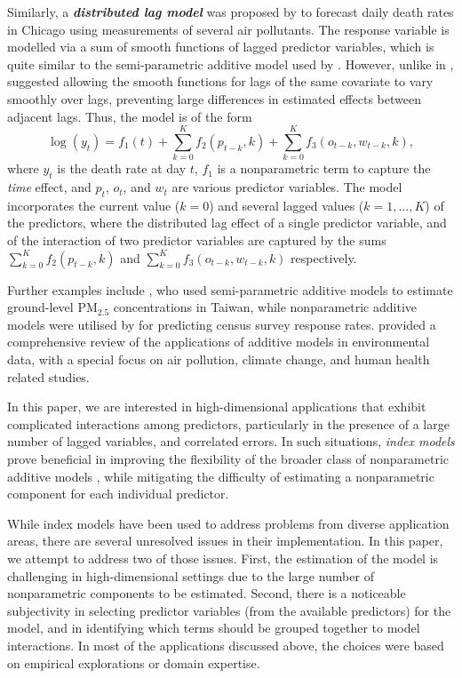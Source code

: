 \documentclass[
  11pt,
  a4paper,
]{article}
\begin{document}
Similarly, a \textbf{\emph{distributed lag model}} was proposed by
\textcite{Wood2017} to forecast daily death rates in Chicago using
measurements of several air pollutants. The response variable is
modelled via a sum of smooth functions of lagged predictor variables,
which is quite similar to the semi-parametric additive model used by
\textcite{FH2012}. However, unlike in \textcite{FH2012},
\textcite{Wood2017} suggested allowing the smooth functions for lags of
the same covariate to vary smoothly over lags, preventing large
differences in estimated effects between adjacent lags. Thus, the model
is of the form \[
 \log(y_{t}) = f_{1}(t) + \sum_{k=0}^{K} f_{2}(p_{t-k}, k) + \sum_{k=0}^{K} f_{3}(o_{t-k}, w_{t-k}, k),
\] where \(y_{t}\) is the death rate at day \(t\), \(f_{1}\) is a
nonparametric term to capture the \emph{time} effect, and \(p_t\),
\(o_t\), and \(w_t\) are various predictor variables. The model
incorporates the current value (\(k = 0\)) and several lagged values
(\(k = 1, \dots, K\)) of the predictors, where the distributed lag
effect of a single predictor variable, and of the interaction of two
predictor variables are captured by the sums
\(\sum_{k=0}^{K} f_{2}(p_{t-k}, k)\) and
\(\sum_{k=0}^{K} f_{3}(o_{t-k}, w_{t-k}, k)\) respectively.

Further examples include \textcite{Ho2020}, who used semi-parametric
additive models to estimate ground-level \(\text{PM}_{2.5}\)
concentrations in Taiwan, while nonparametric additive models were
utilised by \textcite{Ibrahim2021} for predicting census survey response
rates. \textcite{Ravindra2019} provided a comprehensive review of the
applications of additive models in environmental data, with a special
focus on air pollution, climate change, and human health related
studies.

In this paper, we are interested in high-dimensional applications that
exhibit complicated interactions among predictors, particularly in the
presence of a large number of lagged variables, and correlated errors.
In such situations, \emph{index models} prove beneficial in improving
the flexibility of the broader class of nonparametric additive models
\autocite{Radchenko2015}, while mitigating the difficulty of estimating
a nonparametric component for each individual predictor.

While index models have been used to address problems from diverse
application areas, there are several unresolved issues in their
implementation. In this paper, we attempt to address two of those
issues. First, the estimation of the model is challenging in
high-dimensional settings due to the large number of nonparametric
components to be estimated. Second, there is a noticeable subjectivity
in selecting predictor variables (from the available predictors) for the
model, and in identifying which terms should be grouped together to
model interactions. In most of the applications discussed above, the
choices were based on empirical explorations or domain expertise.
\end{document}
